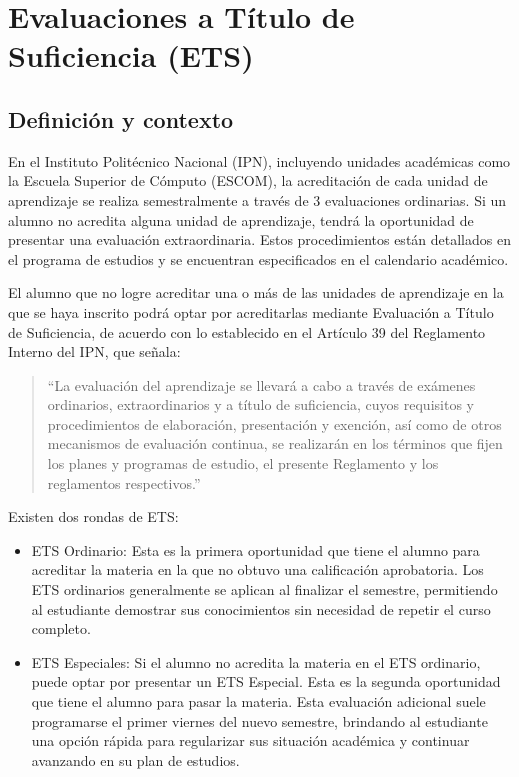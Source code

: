 
\section{Evaluaciones a Título de Suficiencia (ETS)}

\subsection{Definición y contexto}
En el Instituto Politécnico Nacional (IPN), incluyendo unidades académicas como la Escuela Superior de Cómputo (ESCOM), la acreditación de cada unidad de aprendizaje se realiza semestralmente a través de 3 evaluaciones ordinarias. Si un alumno no acredita alguna unidad de aprendizaje, tendrá la oportunidad de presentar una evaluación extraordinaria. Estos procedimientos están detallados en el programa de estudios y se encuentran especificados en el calendario académico.

El alumno que no logre acreditar una o más de las unidades de aprendizaje en la que se haya inscrito podrá optar por acreditarlas mediante Evaluación a Título de Suficiencia, de acuerdo con lo establecido en el Artículo 39 del Reglamento Interno del IPN, que señala: 

\begin{quote}
	``La evaluación del aprendizaje se llevará a cabo a través de exámenes ordinarios, extraordinarios y a título de suficiencia, cuyos requisitos y procedimientos de elaboración, presentación y exención, así como de otros mecanismos de evaluación continua, se realizarán en los términos que fijen los planes y programas de estudio, el presente Reglamento y los reglamentos respectivos.''
\end{quote}

Existen dos rondas de ETS:
\begin{itemize}
	\item ETS Ordinario: Esta es la primera oportunidad que tiene el alumno para acreditar la materia en la que no obtuvo una calificación aprobatoria. Los ETS ordinarios generalmente se aplican al finalizar el semestre, permitiendo al estudiante demostrar sus conocimientos sin necesidad de repetir el curso completo. 
	\item ETS Especiales: Si el alumno no acredita la materia en el ETS ordinario, puede optar por presentar un ETS Especial. Esta es la segunda oportunidad que tiene el alumno para pasar la materia. Esta evaluación adicional suele programarse el primer viernes del nuevo semestre, brindando al estudiante una opción rápida para regularizar sus situación académica y continuar avanzando en su plan de estudios. 
\end{itemize}

